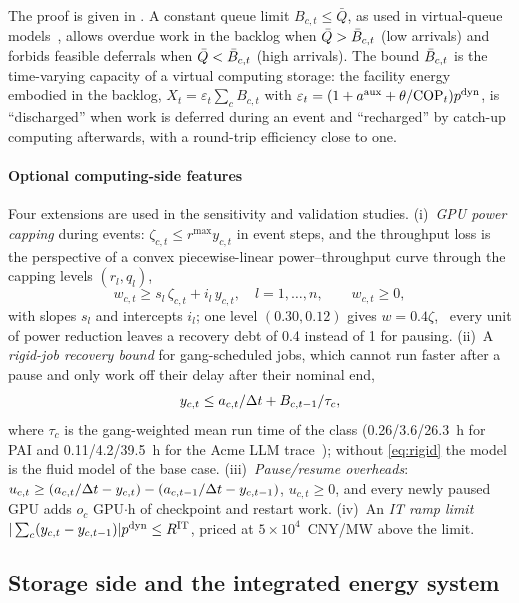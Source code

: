 The proof is given in . A constant queue limit $B_{c,t}\le\bar Q$, as used in virtual-queue
models~\cite{zhang2026bilevel}, allows overdue work in the backlog when $\bar Q>\bar B_{c,t}$ (low arrivals) and forbids
feasible deferrals when $\bar Q<\bar B_{c,t}$ (high arrivals). The bound $\bar B_{c,t}$ is the time-varying capacity of a
virtual computing storage: the facility energy embodied in the backlog, $X_t=\varepsilon_t\sum_cB_{c,t}$ with
$\varepsilon_t=(1+a^{\mathrm{aux}}+\theta/\mathrm{COP}_t)p^{\mathrm{dyn}}$, is ``discharged'' when work is deferred during an event and
``recharged'' by catch-up computing afterwards, with a round-trip efficiency close to one.

\paragraph{Optional computing-side features} Four extensions are used in the sensitivity and validation studies.
(i)~\emph{GPU power capping} during events: $\zeta_{c,t}\le r^{\max}y_{c,t}$ in event steps, and the throughput loss
is the perspective of a convex piecewise-linear power--throughput curve through the capping levels $(r_l,q_l)$,
\begin{equation}
w_{c,t}\ge s_l\,\zeta_{c,t}+i_l\,y_{c,t},\quad l=1,\dots,n,\qquad w_{c,t}\ge0,
\label{eq:capping}
\end{equation}
with slopes $s_l$ and intercepts $i_l$; one level $(0.30,0.12)$ gives $w=0.4\zeta$, \ie\ every unit of power reduction
leaves a recovery debt of 0.4 instead of 1 for pausing. (ii)~A \emph{rigid-job recovery bound} for gang-scheduled jobs,
which cannot run faster after a pause and only work off their delay after their nominal end,
\begin{equation}
y_{c,t}\le a_{c,t}/\Delta t+B_{c,t-1}/\tau_c ,
\label{eq:rigid}
\end{equation}
where $\tau_c$ is the gang-weighted mean run time of the class (0.26/3.6/26.3~h for PAI and 0.11/4.2/39.5~h for the
Acme LLM trace~\cite{hu2024acme}); without \eqref{eq:rigid} the model is the fluid model of the base case.
(iii)~\emph{Pause/resume overheads}: $u_{c,t}\ge(a_{c,t}/\Delta t-y_{c,t})-(a_{c,t-1}/\Delta t-y_{c,t-1})$, $u_{c,t}\ge0$, and
every newly paused GPU adds $o_c$ GPU$\cdot$h of checkpoint and restart work. (iv)~An \emph{IT ramp limit}
$|\sum_c(y_{c,t}-y_{c,t-1})|p^{\mathrm{dyn}}\le R^{\mathrm{IT}}$, priced at $5\times10^4$~CNY/MW above the limit.

\subsection{Storage side and the integrated energy system}
\label{sec:ies}

